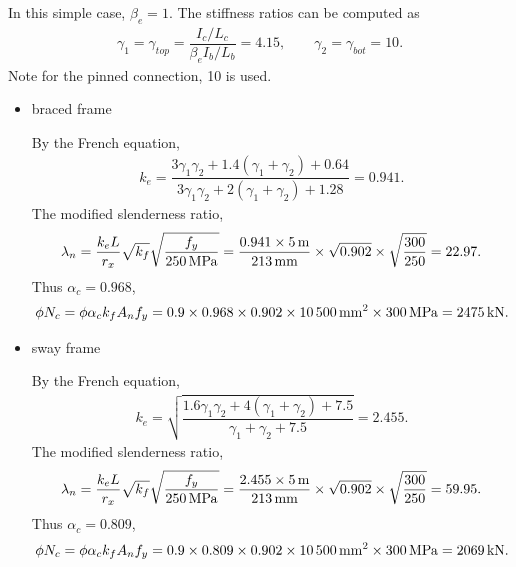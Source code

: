 \begin{solution}
In this simple case, $\beta_e=1$. The stiffness ratios can be computed as
\begin{gather*}
\gamma_1=\gamma_{top}=\dfrac{I_c/L_c}{\beta_eI_b/L_b}=4.15,\qquad
\gamma_2=\gamma_{bot}=10.
\end{gather*}
Note for the pinned connection, \num{10} is used.
\begin{itemize}
\item braced frame

By the French equation,
\begin{gather*}
k_e=\dfrac{3\gamma_1\gamma_2+1.4\left(\gamma_1+\gamma_2\right)+0.64}{3\gamma_1\gamma_2+2\left(\gamma_1+\gamma_2\right)+1.28}=0.941.
\end{gather*}
The modified slenderness ratio,
\begin{gather*}
\lambda_n=\dfrac{k_eL}{r_x}\sqrt{k_f}\sqrt{\dfrac{f_y}{\SI{250}{\mega\pascal}}}=\dfrac{0.941\times\SI{5}{\meter}}{\SI{213}{\milli\meter}}\times\sqrt{0.902}\times\sqrt{\dfrac{300}{250}}=22.97.
\end{gather*}
Thus $\alpha_c=0.968$,
\begin{gather*}
\phi{}N_c=\phi\alpha_ck_fA_nf_y=0.9\times0.968\times0.902\times\SI{10500}{\milli\meter^2}\times\SI{300}{\mega\pascal}=\SI{2475}{\kilo\newton}.
\end{gather*}
\item sway frame

By the French equation,
\begin{gather*}
k_e=\sqrt{\dfrac{1.6\gamma_1\gamma_2+4\left(\gamma_1+\gamma_2\right)+7.5}{\gamma_1+\gamma_2+7.5}}=2.455.
\end{gather*}
The modified slenderness ratio,
\begin{gather*}
\lambda_n=\dfrac{k_eL}{r_x}\sqrt{k_f}\sqrt{\dfrac{f_y}{\SI{250}{\mega\pascal}}}=\dfrac{2.455\times\SI{5}{\meter}}{\SI{213}{\milli\meter}}\times\sqrt{0.902}\times\sqrt{\dfrac{300}{250}}=59.95.
\end{gather*}
Thus $\alpha_c=0.809$,
\begin{gather*}
\phi{}N_c=\phi\alpha_ck_fA_nf_y=0.9\times0.809\times0.902\times\SI{10500}{\milli\meter^2}\times\SI{300}{\mega\pascal}=\SI{2069}{\kilo\newton}.
\end{gather*}
\end{itemize}
\end{solution}

%
%
%
